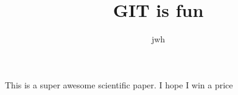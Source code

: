 \documentclass[10pt]{article}
\author{jwh}
\title{GIT is fun}
\begin{document}
	\maketitle
	This is a super awesome scientific paper.
	I hope I win a price
	
\end{document}
